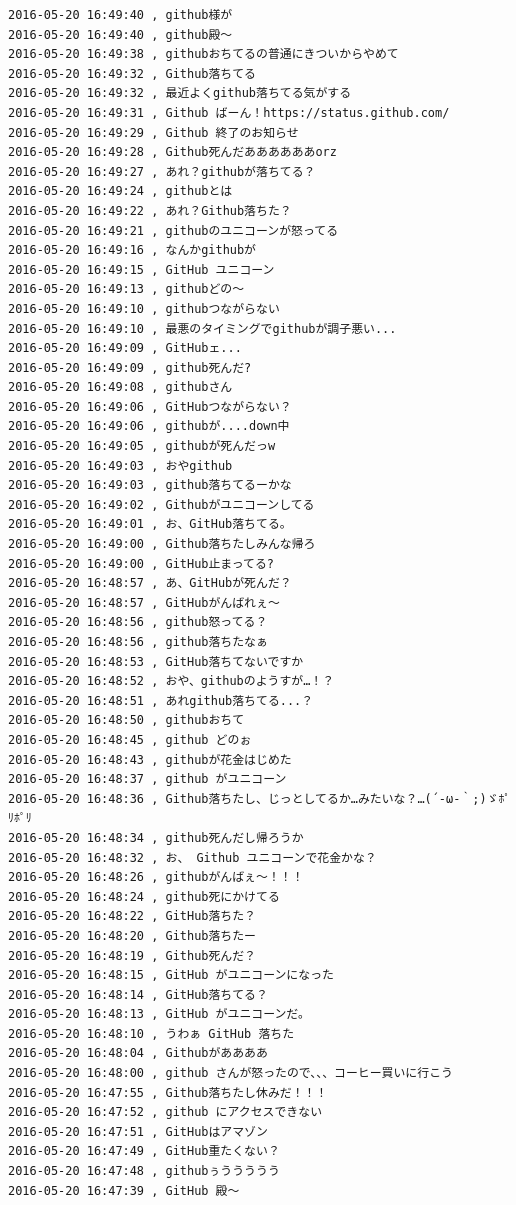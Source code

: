 \begin{verbatim}
2016-05-20 16:49:40 , github様が
2016-05-20 16:49:40 , github殿〜
2016-05-20 16:49:38 , githubおちてるの普通にきついからやめて
2016-05-20 16:49:32 , Github落ちてる
2016-05-20 16:49:32 , 最近よくgithub落ちてる気がする
2016-05-20 16:49:31 , Github ばーん！https://status.github.com/ 
2016-05-20 16:49:29 , Github 終了のお知らせ
2016-05-20 16:49:28 , Github死んだああああああorz
2016-05-20 16:49:27 , あれ？githubが落ちてる？
2016-05-20 16:49:24 , githubとは
2016-05-20 16:49:22 , あれ？Github落ちた？
2016-05-20 16:49:21 , githubのユニコーンが怒ってる
2016-05-20 16:49:16 , なんかgithubが
2016-05-20 16:49:15 , GitHub ユニコーン
2016-05-20 16:49:13 , githubどの〜
2016-05-20 16:49:10 , githubつながらない
2016-05-20 16:49:10 , 最悪のタイミングでgithubが調子悪い...
2016-05-20 16:49:09 , GitHubェ...
2016-05-20 16:49:09 , github死んだ?
2016-05-20 16:49:08 , githubさん
2016-05-20 16:49:06 , GitHubつながらない？
2016-05-20 16:49:06 , githubが....down中
2016-05-20 16:49:05 , githubが死んだっw
2016-05-20 16:49:03 , おやgithub
2016-05-20 16:49:03 , github落ちてるーかな
2016-05-20 16:49:02 , Githubがユニコーンしてる
2016-05-20 16:49:01 , お、GitHub落ちてる。
2016-05-20 16:49:00 , Github落ちたしみんな帰ろ
2016-05-20 16:49:00 , GitHub止まってる?
2016-05-20 16:48:57 , あ、GitHubが死んだ？
2016-05-20 16:48:57 , GitHubがんばれぇ〜
2016-05-20 16:48:56 , github怒ってる？
2016-05-20 16:48:56 , github落ちたなぁ
2016-05-20 16:48:53 , GitHub落ちてないですか
2016-05-20 16:48:52 , おや、githubのようすが…！？
2016-05-20 16:48:51 , あれgithub落ちてる...？
2016-05-20 16:48:50 , githubおちて
2016-05-20 16:48:45 , github どのぉ
2016-05-20 16:48:43 , githubが花金はじめた
2016-05-20 16:48:37 , github がユニコーン
2016-05-20 16:48:36 , Github落ちたし、じっとしてるか…みたいな？…(´-ω-｀;)ゞﾎﾟﾘﾎﾟﾘ
2016-05-20 16:48:34 , github死んだし帰ろうか
2016-05-20 16:48:32 , お、 Github ユニコーンで花金かな？
2016-05-20 16:48:26 , githubがんばぇ〜！！！
2016-05-20 16:48:24 , github死にかけてる
2016-05-20 16:48:22 , GitHub落ちた？
2016-05-20 16:48:20 , Github落ちたー
2016-05-20 16:48:19 , Github死んだ？
2016-05-20 16:48:15 , GitHub がユニコーンになった
2016-05-20 16:48:14 , GitHub落ちてる？
2016-05-20 16:48:13 , GitHub がユニコーンだ。
2016-05-20 16:48:10 , うわぁ GitHub 落ちた
2016-05-20 16:48:04 , Githubがああああ
2016-05-20 16:48:00 , github さんが怒ったので、、、コーヒー買いに行こう
2016-05-20 16:47:55 , Github落ちたし休みだ！！！
2016-05-20 16:47:52 , github にアクセスできない
2016-05-20 16:47:51 , GitHubはアマゾン
2016-05-20 16:47:49 , GitHub重たくない？
2016-05-20 16:47:48 , githubぅううううう
2016-05-20 16:47:39 , GitHub 殿〜

\end{verbatim}
